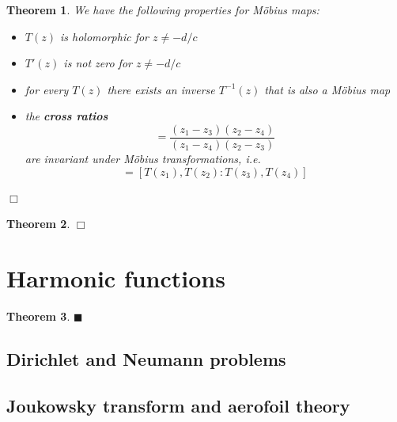 \documentclass[letter-paper]{tufte-book}
\newtheorem{theorem}{\color{pastel-blue}Theorem}[section]
\newcommand{\qed}{\hfill$\blacksquare$}
\newcommand{\qedwhite}{\hfill \ensuremath{\Box}}
\begin{document}
\begin{theorem}
  We have the following properties for M\"obius maps:
  \begin{itemize}
    \item $T(z)$ is holomorphic for $z \neq -d/c$
    \item $T'(z)$ is not zero for $z \neq -d/c$ 
    \item for every $T(z)$ there exists an inverse $T^{-1}(z)$ that is also a
    M\"obius map
    \item the \textbf{cross ratios}
    \begin{equation}
      [z_1, z_2 : z_3, z_4] = \frac{(z_1 - z_3)(z_2 - z_4)}{(z_1 - z_4)(z_2 - z_3)}
    \end{equation}
    are invariant under M\"obius transformations, i.e.
    \begin{equation*}
      [z_1, z_2 : z_3, z_4] = [T(z_1), T(z_2) : T(z_3), T(z_4)]
    \end{equation*}
  \end{itemize}
  \qedwhite
\end{theorem}

\begin{theorem}

\qedwhite

\end{theorem}


\section{Harmonic functions}

\begin{theorem}

\qed

\end{theorem}


\subsection{Dirichlet and Neumann problems}


\subsection{Joukowsky transform and aerofoil theory}
\end{document}
